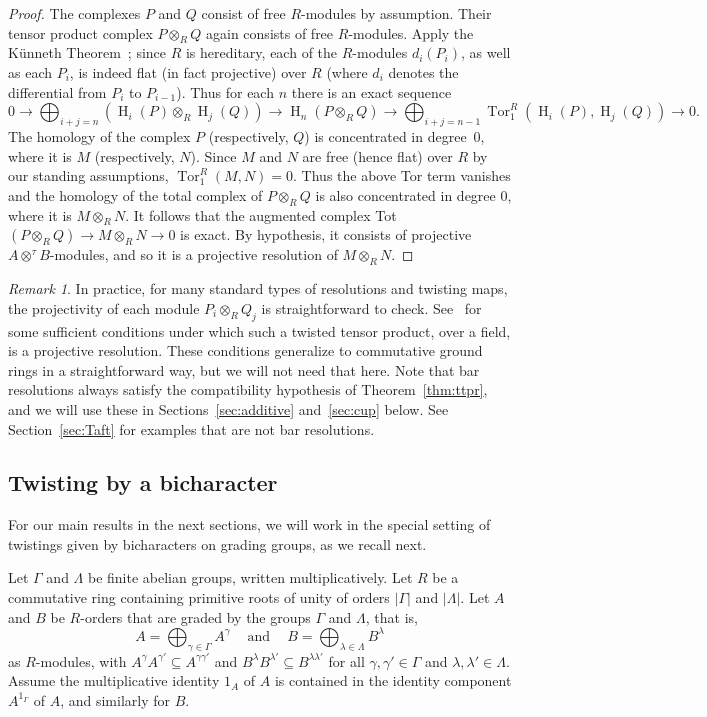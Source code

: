 \documentclass[11pt]{amsart}
\numberwithin{equation}{section}
\theoremstyle{definition}
\theoremstyle{remark}
\newtheorem{remark}[equation]{Remark}
\newcommand{\g}{\gamma}
\newcommand{\h}{\lambda}
\newcommand\Homol{\operatorname{H}}
\newcommand\coh{\Homol}
\newcommand\ot{\otimes}
\newcommand{\ttp}{A\ot^{\tau}\! B}
\DeclareMathOperator{\Tor}{Tor}
\begin{document}
\begin{proof}
The complexes $P$ and $Q$ consist of free $R$-modules by assumption.
Their tensor product complex $P\ot_R Q$ again consists of free $R$-modules.
Apply the K\"unneth Theorem~\cite[Theorem 3.6.3]{Weibel};  
since $R$ is hereditary, each of the 
$R$-modules $d_i(P_i)$, as well as each $P_i$, 
is indeed flat (in fact projective) over $R$
(where $d_i$ denotes the differential from $P_i$ to $P_{i-1}$).
Thus for each $n$ there is an exact sequence
\[
   0\rightarrow \bigoplus_{i+j=n}
  (\coh_i(P)\ot_R \coh_j(Q)) \rightarrow
   \coh_n(P\ot_RQ) \rightarrow
   \bigoplus_{i+j=n-1}
   \Tor^R_1(\coh_i(P), \coh_j(Q)) \rightarrow 0 .
\]
The homology of the complex $P$ (respectively, $Q$) is
concentrated in degree~0, where it is $M$ (respectively, $N$).
Since $M$ and $N$ are free (hence flat) over $R$ by our standing
assumptions, $\Tor^R_1(M,N)=0$. Thus the above Tor term vanishes and
the homology of the total complex of $P\ot_{R} Q$ is also
concentrated in degree 0, where it is $M\ot_R N$. 
It follows that the augmented complex 
Tot$(P\ot_R Q) \rightarrow M\ot_R N\rightarrow 0$
is exact.
By hypothesis, it consists of projective $\ttp$-modules, and so
it is a projective resolution of $M\ot_R N$. 
\end{proof}

\begin{remark}
In practice, for many standard types of resolutions and twisting maps, 
the projectivity of each module $P_i\ot_R Q_j$ is straightforward to check. 
See~\cite[Theorem~5.12]{Shepler-W} for some sufficient conditions
under which such a twisted tensor product, over a field, is a
projective resolution.
These conditions generalize to commutative ground rings in a straightforward way,
but we will not need that here. 
Note that bar resolutions always satisfy the compatibility hypothesis
of Theorem~\ref{thm:ttpr}, and we will use these in 
Sections~\ref{sec:additive} and~\ref{sec:cup} below.  
See Section~\ref{sec:Taft} for examples that are not bar resolutions.
\end{remark}


\subsection*{Twisting by a bicharacter} 
For our main results in the next sections, we will work in the special setting of 
twistings given by bicharacters on grading groups, as
we recall next. 

Let $\Gamma$ and $\Lambda$ be finite abelian groups, written multiplicatively.
Let $R$ be a commutative ring containing primitive
roots of unity of orders $|\Gamma|$ and $|\Lambda|$.
Let $A$ and $B$ be $R$-orders that are graded by the groups
$\Gamma$ and $\Lambda$, that is, 
\[
  A = \bigoplus_{\g\in \Gamma}A^{\g} \ \ \ \ 
  \mbox{ and } \ \ \ \ B = \bigoplus_{\h\in\Lambda} B^{\h}
\]
as $R$-modules, with
$A^{\g}A^{\g '}\subseteq A^{\g \g '}$ and $B^{\h}B^{\h '} \subseteq B^{\h \h '}$
for all $\g , \g'\in \Gamma$ and $\h , \h'\in \Lambda$.
Assume the multiplicative identity $1_A$ of $A$ is contained
in the identity component $A^{1_{\Gamma}}$ of $A$, and similarly for $B$.
\end{document}
